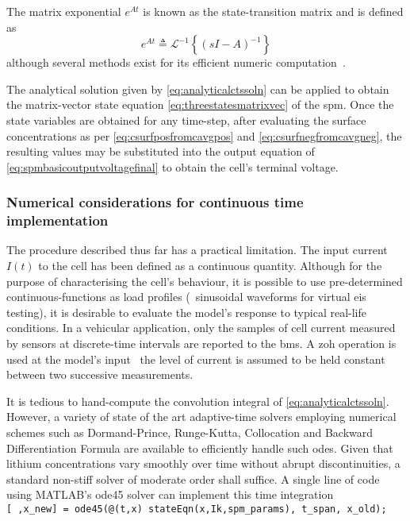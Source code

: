 The matrix exponential $e^{At}$ is known as the state-transition matrix and is
defined as
\begin{equation}
    e^{A t} ≜ \mathcal{L}^{-1}\left\{(s I - A)^{-1}\right\}
\end{equation}
although several methods exist for its efficient numeric
computation~\cite{Moler2003}.

The analytical solution  given by \cref{eq:analyticalctssoln} can  be applied to
obtain the  matrix-vector state  equation \cref{eq:threestatesmatrixvec}  of the
\gls{spm}.  Once the  state  variables  are obtained  for  any time-step,  after
evaluating the  surface concentrations as per  \cref{eq:csurfposfromcavgpos} and
\cref{eq:csurfnegfromcavgneg}, the resulting values  may be substituted into the
output  equation of  \cref{eq:spmbasicoutputvoltagefinal} to  obtain the  cell's
terminal voltage.

\subsubsection*{Numerical considerations for continuous time implementation}

The procedure described  thus far has a practical limitation.  The input current
$I(t)$  to the  cell has  been defined  as a  continuous quantity.  Although for
the  purpose of  characterising  the cell's  behaviour, it  is  possible to  use
pre-determined continuous-functions as load profiles (\eg~sinusoidal waveforms
for virtual \gls{eis} testing), it is desirable to evaluate the model's response
to typical real-life conditions. In a vehicular application, only the samples of
cell current measured by sensors at  discrete-time intervals are reported to the
\gls{bms}. A \gls{zoh} operation is used at the model's input \ie~the level of
current  is assumed  to be  held constant  between two  successive measurements.

It    is    tedious    to    hand-compute   the    convolution    integral    of
\cref{eq:analyticalctssoln}.   However,  a   variety   of  state   of  the   art
adaptive-time  solvers  employing  numerical  schemes  such  as  Dormand-Prince,
Runge-Kutta,  Collocation and  Backward  Differentiation  Formula are  available
to  efficiently  handle  such  \glspl{ode}. Given  that  lithium  concentrations
vary smoothly  over time  without abrupt  discontinuities, a  standard non-stiff
solver  of  moderate   order  shall  suffice.  A  single  line   of  code  using
\textsc{MATLAB}'s ode45  solver can  implement this  time integration \eg~\\
\texttt{[~,x_new] =  ode45(@(t,x) stateEqn(x,Ik,spm_params), t_span,
x_old); }


